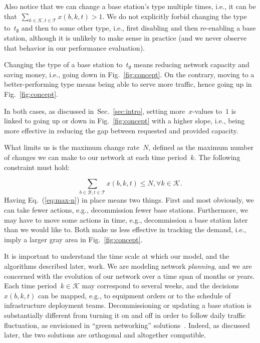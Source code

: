 \documentclass[10pt,journal,cspaper,compsoc]{IEEEtran}
\newcommand{\Fig}[1]{Fig.~\ref{fig:#1}}
\newcommand{\Sec}[1]{Sec.~\ref{sec:#1}}
\newcommand{\Eq}[1]{Eq.~(\ref{eq:#1})}
\newcommand{\Bc}{\mathcal{B}}
\newcommand{\Kc}{\mathcal{K}}
\newcommand{\Tc}{\mathcal{T}}
\begin{document}
Also notice that we can change a base station's type multiple times, i.e., it can be\\
that~$\sum_{k\in\Kc,t\in\Tc}x(b,k,t)>1$. We do not explicitly forbid changing the type to~$t_\emptyset$ and then to
some other type, i.e., first disabling and then re-enabling a base station, although it is unlikely to make sense
in practice (and we never observe that behavior in our performance evaluation).

Changing the type of a base station to~$t_\emptyset$ means reducing network capacity and saving money, i.e.,
going down in \Fig{concept}. On the contrary, moving to a better-performing type means being able to serve
more traffic, hence going up in \Fig{concept}.

In both cases, as discussed in~\Sec{intro}, setting more~$x$-values to~$1$ is linked to going up or down in \Fig{concept}
with a higher slope, i.e., being more effective in reducing the gap between requested and provided capacity.

What limits us is the maximum change rate~$N$, defined as the maximum number of changes
we can make to our network at each time period~$k$. The following constraint must hold:

\begin{equation}
\label{eq:max-n}
\sum_{b\in\Bc,t\in\Tc} x(b,k,t) \leq N, \forall k\in\Kc.
\end{equation}
Having \Eq{max-n} in place means two things. First and most obviously, we can take fewer actions, e.g., 
decommission fewer base stations. Furthermore, we may have to move some actions in time, e.g., decommission a base 
station later than we would like to. Both make us less effective in tracking the demand, i.e., imply a larger gray 
area in \Fig{concept}.

It is important to understand the time scale at which our model, and the algorithms described later, work. We are
modeling network {\em planning}, and we are concerned with the evolution of our network over a time span of
months or years.
Each time period~$k\in\Kc$ may correspond to several weeks, and the decisions~$x(b,k,t)$
can be mapped, e.g., to equipment orders or to the schedule of infrastructure deployment teams.
Decommissioning or updating a base station is substantially different from
turning it on and off in order to follow daily traffic fluctuation, as envisioned in ``green networking''
solutions~\cite{green-ajmone,green-on,peng2011}. Indeed, as discussed later, the two solutions are orthogonal
and altogether compatible.
\end{document}
